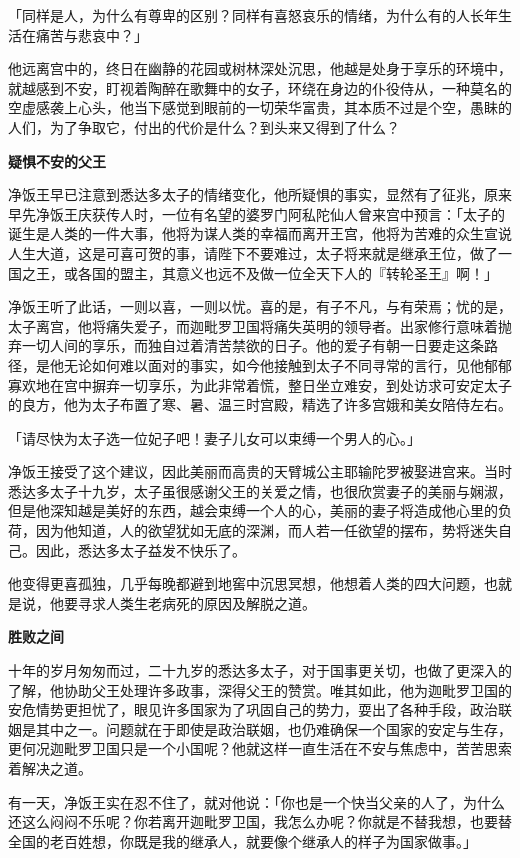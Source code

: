 \documentclass[twoside,openany]{book}
\newcommand{\mt}[1]{\textbullet \textbf{#1}}
\begin{document}
「同样是人，为什么有尊卑的区别？同样有喜怒哀乐的情绪，为什么有的人长年生活在痛苦与悲哀中？」

他远离宫中的，终日在幽静的花园或树林深处沉思，他越是处身于享乐的环境中，就越感到不安，盯视着陶醉在歌舞中的女子，环绕在身边的仆役侍从，一种莫名的空虚感袭上心头，他当下感觉到眼前的一切荣华富贵，其本质不过是个空，愚眛的人们，为了争取它，付出的代价是什么？到头来又得到了什么？

\mt{疑惧不安的父王}

净饭王早已注意到悉达多太子的情绪变化，他所疑惧的事实，显然有了征兆，原来早先净饭王庆获传人时，一位有名望的婆罗门阿私陀仙人曾来宫中预言：「太子的诞生是人类的一件大事，他将为谋人类的幸福而离开王宫，他将为苦难的众生宣说人生大道，这是可喜可贺的事，请陛下不要难过，太子将来就是继承王位，做了一国之王，或各国的盟主，其意义也远不及做一位全天下人的『转轮圣王』啊！」

净饭王听了此话，一则以喜，一则以忧。喜的是，有子不凡，与有荣焉；忧的是，太子离宫，他将痛失爱子，而迦毗罗卫国将痛失英明的领导者。出家修行意味着抛弃一切人间的享乐，而独自过着清苦禁欲的日子。他的爱子有朝一日要走这条路径，是他无论如何难以面对的事实，如今他接触到太子不同寻常的言行，见他郁郁寡欢地在宫中摒弃一切享乐，为此非常着慌，整日坐立难安，到处访求可安定太子的良方，他为太子布置了寒、暑、温三时宫殿，精选了许多宫娥和美女陪侍左右。

「请尽快为太子选一位妃子吧！妻子儿女可以束缚一个男人的心。」

净饭王接受了这个建议，因此美丽而高贵的天臂城公主耶输陀罗被娶进宫来。当时悉达多太子十九岁，太子虽很感谢父王的关爱之情，也很欣赏妻子的美丽与娴淑，但是他深知越是美好的东西，越会束缚一个人的心，美丽的妻子将造成他心里的负荷，因为他知道，人的欲望犹如无底的深渊，而人若一任欲望的摆布，势将迷失自己。因此，悉达多太子益发不快乐了。

他变得更喜孤独，几乎每晚都避到地窖中沉思冥想，他想着人类的四大问题，也就是说，他要寻求人类生老病死的原因及解脱之道。

\mt{胜败之间}

十年的岁月匆匆而过，二十九岁的悉达多太子，对于国事更关切，也做了更深入的了解，他协助父王处理许多政事，深得父王的赞赏。唯其如此，他为迦毗罗卫国的安危情势更担忧了，眼见许多国家为了巩固自己的势力，耍出了各种手段，政治联姻是其中之一。问题就在于即使是政治联姻，也仍难确保一个国家的安定与生存，更何况迦毗罗卫国只是一个小国呢？他就这样一直生活在不安与焦虑中，苦苦思索着解决之道。

有一天，净饭王实在忍不住了，就对他说：「你也是一个快当父亲的人了，为什么还这么闷闷不乐呢？你若离开迦毗罗卫国，我怎么办呢？你就是不替我想，也要替全国的老百姓想，你既是我的继承人，就要像个继承人的样子为国家做事。」
\end{document}
